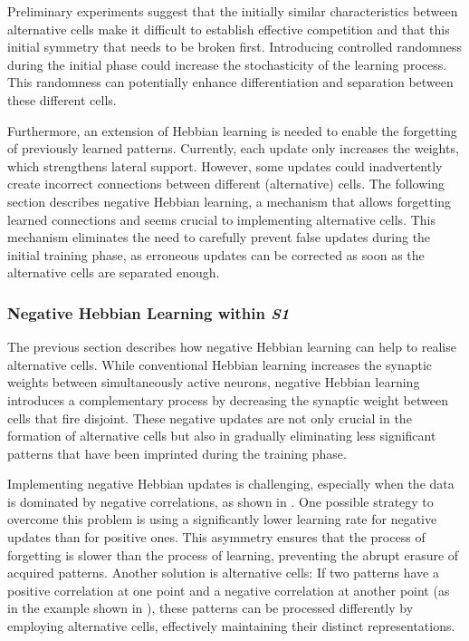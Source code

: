 Preliminary experiments suggest that the initially similar characteristics between alternative cells make it difficult to establish effective competition and that this initial symmetry that needs to be broken first.
Introducing controlled randomness during the initial phase could increase the stochasticity of the learning process. This randomness can potentially enhance differentiation and separation between these different cells.

Furthermore, an extension of Hebbian learning is needed to enable the forgetting of previously learned patterns.
Currently, each update only increases the weights, which strengthens lateral support.
However, some updates could inadvertently create incorrect connections between different (alternative) cells.
The following section describes negative Hebbian learning, a mechanism that allows forgetting learned connections and seems crucial to implementing alternative cells.
This mechanism eliminates the need to carefully prevent false updates during the initial training phase, as erroneous updates can be corrected as soon as the alternative cells are separated enough.

\subsubsection{Negative Hebbian Learning within \emph{S1}}
The previous section describes how negative Hebbian learning can help to realise alternative cells.
While conventional Hebbian learning increases the synaptic weights between simultaneously active neurons, negative Hebbian learning introduces a complementary process by decreasing the synaptic weight between cells that fire disjoint.
These negative updates are not only crucial in the formation of alternative cells but also in gradually eliminating less significant patterns that have been imprinted during the training phase.

Implementing negative Hebbian updates is challenging, especially when the data is dominated by negative correlations, as shown in .
One possible strategy to overcome this problem is using a significantly lower learning rate for negative updates than for positive ones.
This asymmetry ensures that the process of forgetting is slower than the process of learning, preventing the abrupt erasure of acquired patterns.
Another solution is alternative cells: If two patterns have a positive correlation at one point and a negative correlation at another point (as in the example shown in ), these patterns can be processed differently by employing alternative cells, effectively maintaining their distinct representations.


